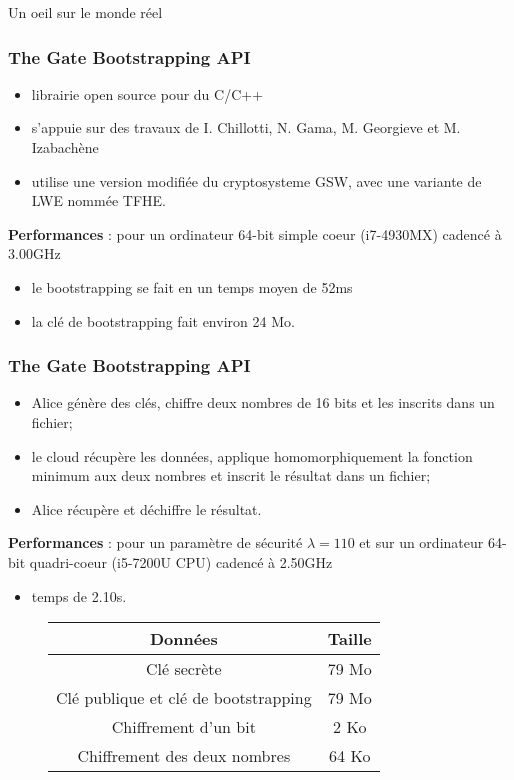 \documentclass[10pt,xcolor={usenames,dvipsnames}]{beamer}
\begin{document}
\begin{section}{Un oeil sur le monde réel}


\begin{frame} 
\frametitle{The Gate Bootstrapping API}
\begin{itemize}
\item librairie open source pour du C/C++ 
\item s'appuie sur des travaux de I. Chillotti, N. Gama, M. Georgieve et M. Izabachène 
\item utilise une version modifiée du cryptosysteme GSW, avec une variante de LWE nommée TFHE.
\end{itemize}
\textbf{Performances} : pour un ordinateur 64-bit simple coeur (i7-4930MX) cadencé à 3.00GHz
\begin{itemize}
\item le bootstrapping se fait en un temps moyen de 52ms
\item la clé de bootstrapping fait environ 24 Mo.
\end{itemize}
 

\end{frame} 

\begin{frame} 
\frametitle{The Gate Bootstrapping API}
\begin{itemize}
\item Alice génère des clés, chiffre deux nombres de 16 bits et les inscrits dans un fichier;
\item le cloud récupère les données, applique homomorphiquement la fonction minimum aux deux nombres et inscrit le résultat dans un fichier;
\item Alice récupère et déchiffre le résultat.
\end{itemize}
\textbf{Performances} : pour un paramètre de sécurité $\lambda = 110$ et sur un ordinateur 64-bit quadri-coeur (i5-7200U CPU) cadencé à 2.50GHz 
\begin{itemize}
\item temps de 2.10s.
\end{itemize}
\begin{figure}
\begin{tabular}{|c|c|}
\hline
Données & Taille \\
\hline
Clé secrète & 79 Mo \\
\hline
Clé publique et clé de bootstrapping  & 79 Mo \\
\hline
Chiffrement d'un bit & 2 Ko \\
\hline
Chiffrement des deux nombres & 64 Ko\\
\hline
\end{tabular}
\end{figure}


\end{frame}
\end{section}
\end{document}
